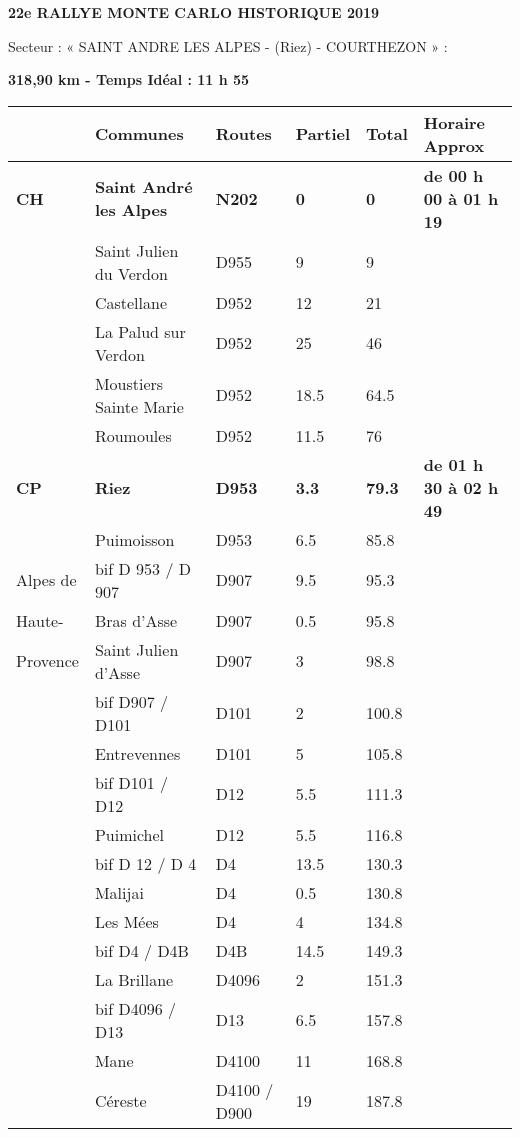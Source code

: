 \documentclass{article}%
\begin{document}
%
\normalsize%
\begin{center} \textbf{\LARGE{22e RALLYE MONTE CARLO HISTORIQUE 2019}} \end{center}%
\begin{flushleft} Secteur : « SAINT ANDRE LES ALPES - (Riez) -  COURTHEZON » :
 \end{flushleft}%
\begin{flushright} \textbf{318,90 km - Temps Idéal : 11 h 55
} \end{flushright}%
\begin{longtable}{p{2.25cm}|p{7.0cm}|p{1.5cm}|p{1.5cm}|p{1.5cm}|p{3.5cm}}%
\hline%
&Communes&Routes&Partiel&Total&Horaire Approx\\%
\hline%
\endhead%
\endfoot%
\endlastfoot%
\textbf{﻿CH}&\textbf{Saint André les Alpes}&\textbf{N202}&\textbf{0}&\textbf{0}&\textbf{de 00 h 00 à 01 h 19}\\%
 &Saint Julien du Verdon&D955&9&9& \\%
 &Castellane&D952&12&21& \\%
 &La Palud sur Verdon&D952&25&46& \\%
 &Moustiers Sainte Marie&D952&18.5&64.5& \\%
 &Roumoules&D952&11.5&76& \\%
\textbf{CP}&\textbf{Riez}&\textbf{D953}&\textbf{3.3}&\textbf{79.3}&\textbf{de 01 h 30 à 02 h 49}\\%
 &Puimoisson&D953&6.5&85.8& \\%
Alpes de&bif D 953 / D 907&D907&9.5&95.3& \\%
Haute-&Bras d'Asse&D907&0.5&95.8& \\%
Provence&Saint Julien d'Asse&D907&3&98.8& \\%
 &bif D907 / D101&D101&2&100.8& \\%
 &Entrevennes&D101&5&105.8& \\%
 &bif D101 / D12&D12&5.5&111.3& \\%
 &Puimichel&D12&5.5&116.8& \\%
 &bif D 12 / D 4&D4&13.5&130.3& \\%
 &Malijai&D4&0.5&130.8& \\%
 &Les Mées&D4&4&134.8& \\%
 &bif D4 / D4B&D4B&14.5&149.3& \\%
 &La Brillane&D4096&2&151.3& \\%
 &bif D4096 / D13&D13&6.5&157.8& \\%
 &Mane&D4100&11&168.8& \\%
 &Céreste&D4100 / D900&19&187.8& \\%

\end{longtable}
\end{document}
